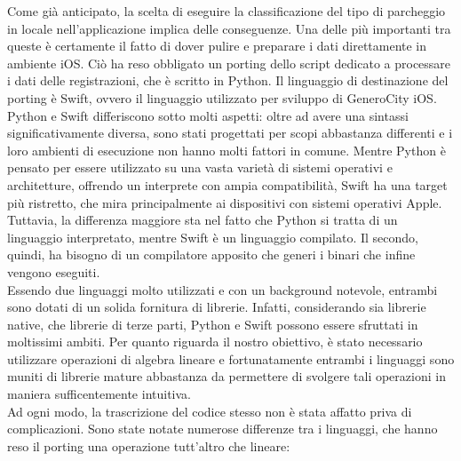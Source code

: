 Come già anticipato, la scelta di eseguire la classificazione del tipo di
parcheggio in locale nell'applicazione implica delle conseguenze.
Una delle più importanti tra queste è certamente il fatto di dover
pulire e preparare i dati direttamente in ambiente iOS. Ciò
ha reso obbligato un porting dello script dedicato a processare i
dati delle registrazioni, che è scritto in Python. Il linguaggio di 
destinazione del porting è Swift, ovvero il linguaggio utilizzato
per sviluppo di GeneroCity iOS.\\
Python e Swift differiscono sotto molti aspetti: oltre ad avere una sintassi
significativamente diversa, sono stati progettati per scopi abbastanza 
differenti e i loro ambienti di esecuzione non hanno molti fattori 
in comune. Mentre Python è pensato per essere utilizzato su una vasta
varietà di sistemi operativi e architetture, offrendo un interprete
con ampia compatibilità, Swift ha una target più ristretto, che 
mira principalmente ai dispositivi con sistemi operativi Apple.
Tuttavia, la differenza maggiore sta nel fatto che Python si tratta
di un linguaggio interpretato, mentre Swift è un linguaggio compilato. 
Il secondo, quindi, ha bisogno di un compilatore apposito che generi
i binari che infine vengono eseguiti.\\
Essendo due linguaggi molto utilizzati e con un background notevole,
entrambi sono dotati di un solida fornitura di librerie. Infatti, 
considerando sia librerie native, che librerie di terze parti,
Python e Swift possono essere sfruttati in moltissimi ambiti.
Per quanto riguarda il nostro obiettivo, è stato necessario
utilizzare operazioni di algebra lineare e fortunatamente entrambi i
linguaggi sono muniti di librerie mature abbastanza da permettere di 
svolgere tali operazioni in maniera sufficentemente intuitiva.\\
Ad ogni modo, la trascrizione del codice stesso non è stata affatto
priva di complicazioni. Sono state notate numerose differenze tra i
linguaggi, che hanno reso il porting una operazione tutt'altro che 
lineare:
